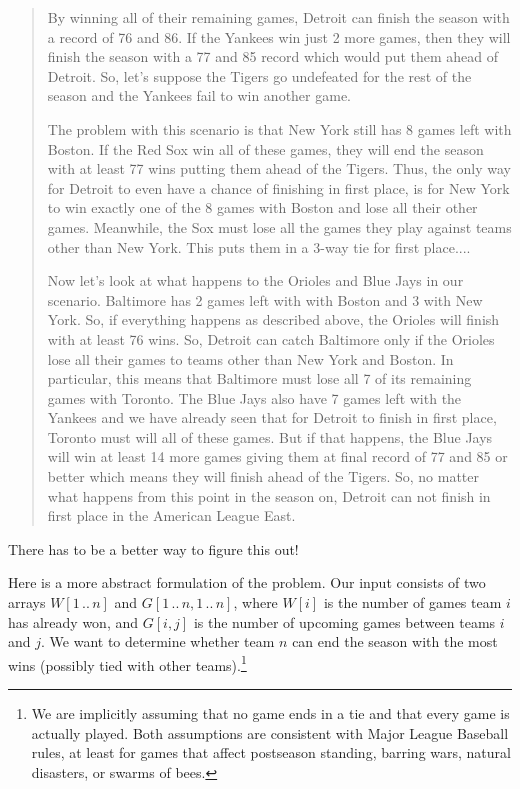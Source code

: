 \begin{quote}
\sffamily\fontsize{8.1}{11}\selectfont\setlength{\parindent}{1.6em}
By winning all of their remaining games, Detroit can finish the season with a record of 76 and 86. If the Yankees win just 2 more games, then they will finish the season with a 77 and 85 record which would put them ahead of Detroit. So, let’s suppose the Tigers go undefeated for the rest of the season and the Yankees fail to win another game.

The problem with this scenario is that New York still has 8 games left with Boston. If the Red Sox win all of these games, they will end the season with at least 77 wins putting them ahead of the Tigers. Thus, the only way for Detroit to even have a chance of finishing in first place, is for New York to win exactly one of the 8 games with Boston and lose all their other games. Meanwhile, the Sox must lose all the games they play against teams other than New York. This puts them in a 3-way tie for first place....

Now let’s look at what happens to the Orioles and Blue Jays in our scenario. Baltimore has 2 games left with with Boston and 3 with New York. So, if everything happens as described above, the Orioles will finish with at least 76 wins. So, Detroit can catch Baltimore only if the Orioles lose all their games to teams other than New York and Boston. In particular, this means that Baltimore must lose all 7 of its remaining games with Toronto. The Blue Jays also have 7 games left with the Yankees and we have already seen that for Detroit to finish in first place, Toronto must will all of these games. But if that happens, the Blue Jays will win at least 14 more games giving them at final record of 77 and 85 or better which means they will finish ahead of the Tigers. So, no matter what happens from this point in the season on, Detroit can not finish in first place in the American League East.
\end{quote}
\noindent There has to be a better way to figure this out!

Here is a more abstract formulation of the problem.
Our input consists of two arrays $W[1\,..\,n]$ and $G[1\,..\,n,1\,..\,n]$, where $W[i]$ is the number of games team $i$ has already won, and $G[i,j]$ is the number of upcoming games between teams $i$ and $j$.
We want to determine whether team $n$ can end the season with the most wins (possibly tied with other teams).\footnote{We are implicitly assuming that no game ends in a tie and that every game is actually played. Both assumptions are consistent with Major League Baseball rules, at least for games that affect postseason standing, barring wars, natural disasters, or swarms of bees.}

